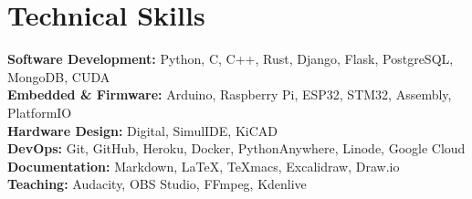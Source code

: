 \documentclass[letterpaper,11pt]{article}
\makeatletter
\newcommand{\resumeItem}[1]{
  \item\small{
    {#1 \vspace{-2pt}}
  }
}
\newcommand{\resumeProjectHeading}[2]{
    \item
    \begin{tabular*}{0.97\textwidth}{l@{\extracolsep{\fill}}r}
      \small#1 & #2 \\
    \end{tabular*}\vspace{-7pt}
}
\newcommand{\resumeSubHeadingListEnd}{\end{itemize}}
\newcommand{\resumeItemListStart}{\begin{itemize}}
\newcommand{\resumeItemListEnd}{\end{itemize}\vspace{-5pt}}
\makeatother
\begin{document}
          

\section{Technical Skills}
 \begin{itemize}[leftmargin=0.15in, label={}]
    \small{\item{
    
     \textbf{Software Development:}{ Python, C, C++, Rust, Django, Flask, PostgreSQL, MongoDB, CUDA } \\
     \textbf{Embedded \& Firmware:}{ Arduino, Raspberry Pi, ESP32, STM32, Assembly, PlatformIO } \\
     \textbf{Hardware Design:}{ Digital, SimulIDE, KiCAD } \\
     \textbf{DevOps:}{ Git, GitHub, Heroku, Docker, PythonAnywhere, Linode, Google Cloud } \\
     \textbf{Documentation:}{ Markdown, \LaTeX, TeXmacs, Excalidraw, Draw.io } \\
     \textbf{Teaching:}{ Audacity, OBS Studio, FFmpeg, Kdenlive} \\
    }}
 \end{itemize}
\end{document}
